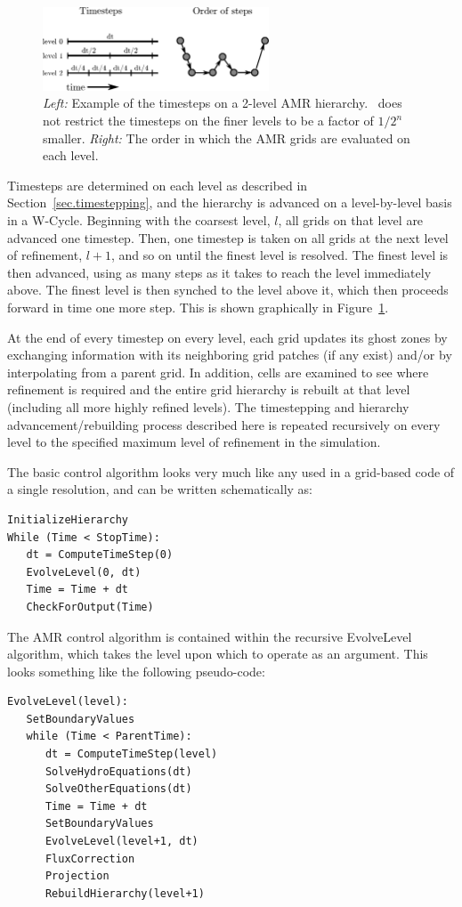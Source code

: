 \begin{figure}
\begin{center}
\includegraphics[width=0.6\textwidth]{figures/timestepping.eps}
\end{center}
\caption{\emph{Left:} Example of the timesteps on a 2-level AMR
  hierarchy.  \enzo\ does not restrict the timesteps on the finer levels
  to be a factor of $1/2^n$ smaller.  \emph{Right:} The order in which
  the AMR grids are evaluated on each level.\vspace{1ex}}
\label{fig:wcycle}
\end{figure}

Timesteps are determined on each level as described in Section~\ref{sec.timestepping}, and the hierarchy is advanced on
a level-by-level basis in a W-Cycle.    Beginning with the coarsest level, $l$, all grids on that level are advanced one
timestep.  Then, one timestep is taken on all grids at the next level of refinement, $l+1$, and so on until the finest level is resolved. The finest level is then advanced, using as many steps as it takes to reach the level immediately above.  The finest level is then synched to the level above it, which then proceeds forward in time one more step.  This is shown graphically in Figure~\ref{fig:wcycle}.

At the end of every timestep on every level, each grid updates its ghost zones by exchanging information with its neighboring grid patches (if any exist) and/or by interpolating from a parent grid.  In addition, cells are examined to see where refinement is required and the entire grid hierarchy is rebuilt at that level (including all more highly refined levels).  The timestepping and hierarchy advancement/rebuilding process described here is repeated recursively on every level to the specified maximum level of refinement in the simulation. 

The basic control algorithm looks very much like any used in a grid-based code of a single resolution, and can be written schematically as:
\begin{verbatim}
InitializeHierarchy
While (Time < StopTime):
   dt = ComputeTimeStep(0)
   EvolveLevel(0, dt)
   Time = Time + dt
   CheckForOutput(Time)
\end{verbatim}
The AMR control algorithm is contained within the recursive
EvolveLevel algorithm, which takes the level upon which to operate as an
argument.  This looks something like the following pseudo-code:
\begin{verbatim}
EvolveLevel(level):
   SetBoundaryValues
   while (Time < ParentTime):
      dt = ComputeTimeStep(level)
      SolveHydroEquations(dt)
      SolveOtherEquations(dt)
      Time = Time + dt
      SetBoundaryValues
      EvolveLevel(level+1, dt)
      FluxCorrection
      Projection
      RebuildHierarchy(level+1)
\end{verbatim}

